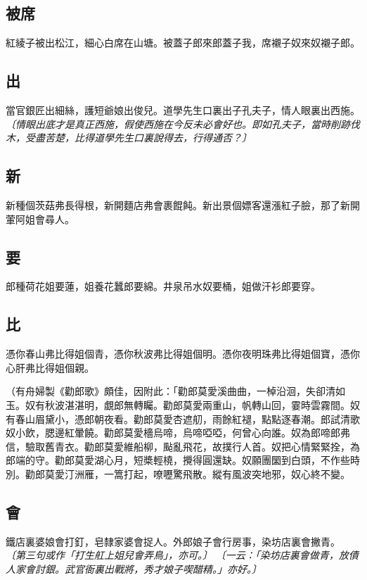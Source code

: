 \subsection*{被席}

紅綾子被出松江，細心白席在山塘。被蓋子郎來郎蓋子我，席襯子奴來奴襯子郎。

\subsection*{出}

當官銀匠出細絲，護短爺娘出俊兒。道學先生口裏出子孔夫子，情人眼裏出西施。
\textit{〔情眼出底才是真正西施，假使西施在今反未必會好也。即如孔夫子，當時削跡伐木，受盡苦楚，比得道學先生口裏說得去，行得通否？〕}

\subsection*{新}

新種個茨菇弗長得根，新開麵店弗會裹餛飩。新出景個嫖客還漲紅子臉，那了新開葷阿姐會尋人。

\subsection*{要}

郎種荷花姐要蓮，姐養花蠶郎要綿。井泉吊水奴要桶，姐做汗衫郎要穿。

\subsection*{比}

憑你春山弗比得姐個青，憑你秋波弗比得姐個明。憑你夜明珠弗比得姐個寶，憑你心肝弗比得姐個親。

（有舟婦製《勸郎歌》頗佳，因附此：「勸郎莫愛溪曲曲，一棹沿洄，失卻清如玉。奴有秋波湛湛明，覷郎無轉矚。勸郎莫愛兩重山，帆轉山回，霎時雲霧間。奴有春山眉黛小，憑郎朝夜看。勸郎莫愛杏遮舠，雨餘紅褪，點點逐春潮。郎試清歌奴小飲，腮邊紅暈饒。勸郎莫愛檣烏啼，烏啼啞啞，何曾心向誰。奴為郎啼郎弗信，驗取舊青衣。勸郎莫愛維船柳，颭亂飛花，故撲行人首。奴把心情緊緊拴，為郎端的守。勸郎莫愛湖心月，短槳輕橈，攪得圓還缺。奴願團圞到白頭，不作些時別。勸郎莫愛汀洲雁，一篙打起，嘹嚦驚飛散。縱有風波突地邪，奴心終不變。

\subsection*{會}

鐵店裏婆娘會打釘，皂隸家婆會捉人。外郎娘子會行房事，染坊店裏會撇青。
\textit{〔第三句或作「打生舡上姐兒會弄鳥」，亦可。〕}
\textit{〔一云：「染坊店裏會做青，放債人家會討銀。武官衙裏出戰將，秀才娘子喫醋精。」亦好。〕}

